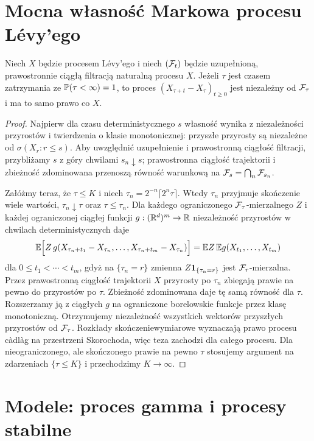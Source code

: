 \section{Mocna własność Markowa procesu Lévy'ego}

\begin{twierdzenie}
\label{th:levy-strong-markov}
Niech $X$ będzie procesem Lévy'ego i niech
$(\mathcal{F}_t)$ będzie uzupełnioną, prawostronnie ciągłą
filtracją naturalną procesu $X$.
Jeżeli $\tau$ jest czasem zatrzymania ze
$\mathbb{P}(\tau<\infty)=1$, to proces
$(X_{\tau+t}-X_\tau)_{t\ge0}$ jest niezależny od
$\mathcal{F}_\tau$ i ma to samo prawo co $X$.
\end{twierdzenie}
\begin{proof}
Najpierw dla czasu deterministycznego $s$ własność wynika
z niezależności przyrostów i twierdzenia o klasie
monotonicznej: przyszłe przyrosty są niezależne od
$\sigma(X_r:r\le s)$. Aby uwzględnić uzupełnienie i
prawostronną ciągłość filtracji, przybliżamy $s$ z góry
chwilami $s_n\downarrow s$; prawostronna ciągłość
trajektorii i zbieżność zdominowana przenoszą równość
warunkową na $\mathcal{F}_s=\bigcap_{n}\mathcal{F}_{s_n}$.

Załóżmy teraz, że $\tau\le K$ i niech
$\tau_n=2^{-n}\lceil2^n\tau\rceil$.
Wtedy $\tau_n$ przyjmuje skończenie wiele wartości,
$\tau_n\downarrow\tau$ oraz $\tau\le\tau_n$.
Dla każdego ograniczonego $\mathcal{F}_\tau$-mierzalnego $Z$
i każdej ograniczonej ciągłej funkcji
$g:(\mathbb{R}^d)^m\to\mathbb{R}$ niezależność przyrostów w
chwilach deterministycznych daje
\[
\mathbb{E}\Big[Z\,g(X_{\tau_n+t_1}-X_{\tau_n},\ldots,
 X_{\tau_n+t_m}-X_{\tau_n})\Big]
=\mathbb{E} Z\,\mathbb{E} g(X_{t_1},\ldots,X_{t_m})
\]
dla $0\le t_1<\cdots<t_m$, gdyż na
$\{\tau_n=r\}$ zmienna $Z\mathbf{1}_{\{\tau_n=r\}}$
jest $\mathcal{F}_r$-mierzalna. Przez prawostronną ciągłość
trajektorii $X$ przyrosty po $\tau_n$ zbiegają
prawie na pewno do przyrostów po $\tau$.
Zbieżność zdominowana daje tę samą równość dla $\tau$.
Rozszerzamy ją z ciągłych $g$ na ograniczone borelowskie
funkcje przez klasę monotoniczną. Otrzymujemy niezależność
wszystkich wektorów przyszłych przyrostów od $\mathcal{F}_\tau$.
Rozkłady skończeniewymiarowe wyznaczają prawo procesu
càdlàg na przestrzeni Skorochoda, więc teza zachodzi
dla całego procesu. Dla nieograniczonego, ale skończonego
prawie na pewno $\tau$ stosujemy argument na zdarzeniach
$\{\tau\le K\}$ i przechodzimy $K\to\infty$.
\end{proof}

\section{Modele: proces gamma i procesy stabilne}


